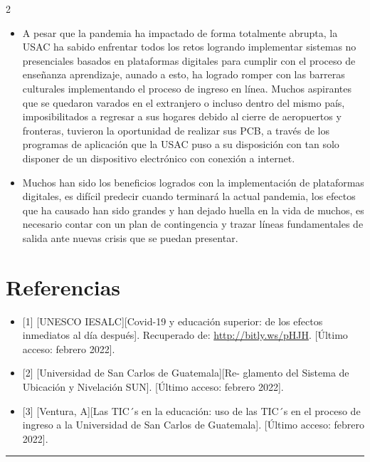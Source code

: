 \documentclass[12pt,spanish,Letterpaper,openany]{book}
\newcommand{\HRule}{\begin{center}\rule{0.5\linewidth}{0.2mm}\end{center}}
\begin{document}
\begin {multicols}{2}
\begin{itemize}
\item
  A pesar que la pandemia ha impactado de forma totalmente abrupta, la USAC ha sabido enfrentar todos los retos logrando implementar sistemas no presenciales basados en plataformas digitales para cumplir con el proceso de enseñanza aprendizaje, aunado a esto, ha logrado romper con las barreras culturales implementando el proceso de ingreso en línea. Muchos aspirantes que se quedaron varados en el extranjero o incluso dentro del mismo país, imposibilitados a regresar a sus hogares debido al cierre de aeropuertos y fronteras, tuvieron la oportunidad de realizar sus PCB, a través de los programas de aplicación que la USAC puso a su disposición con tan solo disponer de un dispositivo electrónico con conexión a internet.
\item
  Muchos han sido los beneficios logrados con la implementación de plataformas digitales, es difícil predecir cuando terminará la actual pandemia, los efectos que ha causado han sido grandes y han dejado huella en la vida de muchos, es necesario contar con un plan de contingencia y trazar líneas fundamentales de salida ante nuevas crisis que se puedan presentar.
\end{itemize}

\hypertarget{referencias-9}{%
\section*{Referencias}\label{referencias-9}}

\begin{itemize}
\item
  {[}1{]} {[}UNESCO IESALC{]}{[}Covid-19 y educación superior: de los efectos inmediatos al día después{]}. Recuperado de: \url{http://bitly.ws/pHJH}. {[}Último acceso: febrero 2022{]}.
\item
  {[}2{]} {[}Universidad de San Carlos de Guatemala{]}{[}Re-
  glamento del Sistema de Ubicación y Nivelación SUN{]}. {[}Último acceso: febrero 2022{]}.
\item
  {[}3{]} {[}Ventura, A{]}{[}Las TIC´s en la educación: uso de las TIC´s en el proceso de ingreso a la Universidad de San Carlos de Guatemala{]}. {[}Último acceso: febrero 2022{]}.
\end{itemize}

\end {multicols}
\medskip
\HRule
\medskip
\end{document}
